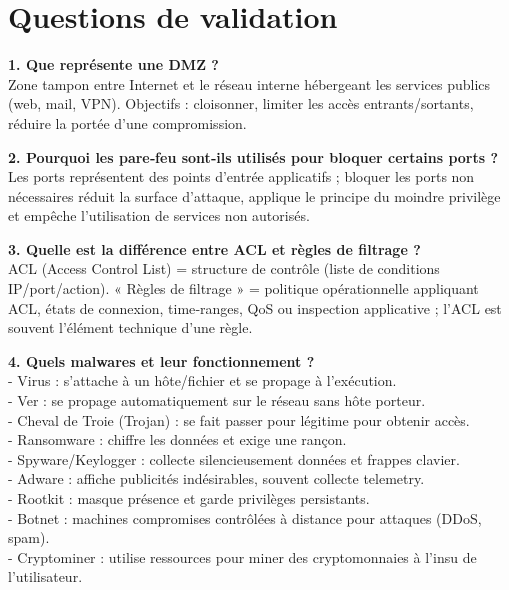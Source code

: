 \section*{Questions de validation}

\noindent \textbf{1. Que représente une DMZ ?} \\
Zone tampon entre Internet et le réseau interne hébergeant les services publics (web, mail, VPN). Objectifs : cloisonner, limiter les accès entrants/sortants, réduire la portée d'une compromission.

\medskip

\noindent \textbf{2. Pourquoi les pare‑feu sont‑ils utilisés pour bloquer certains ports ?} \\
Les ports représentent des points d'entrée applicatifs ; bloquer les ports non nécessaires réduit la surface d'attaque, applique le principe du moindre privilège et empêche l'utilisation de services non autorisés.

\medskip

\noindent \textbf{3. Quelle est la différence entre ACL et règles de filtrage ?} \\
ACL (Access Control List) = structure de contrôle (liste de conditions IP/port/action). « Règles de filtrage » = politique opérationnelle appliquant ACL, états de connexion, time‑ranges, QoS ou inspection applicative ; l'ACL est souvent l'élément technique d'une règle.

\medskip

\noindent \textbf{4. Quels malwares et leur fonctionnement ?} \\
- Virus : s'attache à un hôte/fichier et se propage à l'exécution. \\
- Ver : se propage automatiquement sur le réseau sans hôte porteur. \\
- Cheval de Troie (Trojan) : se fait passer pour légitime pour obtenir accès. \\
- Ransomware : chiffre les données et exige une rançon. \\
- Spyware/Keylogger : collecte silencieusement données et frappes clavier. \\
- Adware : affiche publicités indésirables, souvent collecte telemetry. \\
- Rootkit : masque présence et garde privilèges persistants. \\
- Botnet : machines compromises contrôlées à distance pour attaques (DDoS, spam). \\
- Cryptominer : utilise ressources pour miner des cryptomonnaies à l'insu de l'utilisateur.

